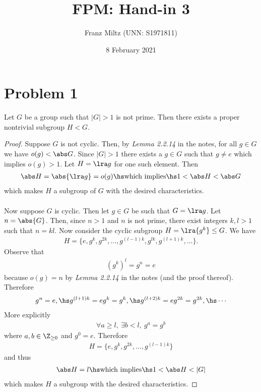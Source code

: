 \documentclass{article}
\begin{document}
\title{FPM: Hand-in 3}
\author{Franz Miltz (UNN: S1971811)}
\date{8 February 2021}
\maketitle

\section*{Problem 1}

\begin{claim*}
    Let $G$ be a group such that $|G|>1$ is not prime. Then
    there exists a proper nontrivial subgroup $H<G$.
\end{claim*}

\begin{proof}
    Suppose $G$ is not cyclic. Then, by \emph{Lemma 2.2.14} in the notes,
    for all $g\in G$ we have $o(g)<\abs G$. Since $|G|>1$ there exists
    a $g\in G$ such that $g\not=e$ which implies $o(g)>1$.
    Let $H=\lra g$ for one such element. Then
    \begin{align*}
        \abs H = \abs{\lra g} = o(g) \hs\text{which implies}\hs 1 < \abs H < \abs G
    \end{align*}
    which makes $H$ a subgroup of $G$ with
    the desired characteristics.\\\\
    Now suppose $G$ is cyclic. Then let $g\in G$ be such that
    $G=\lra g$. Let $n=\abs{G}$. Then, since $n>1$ and $n$ is not prime,
    there exist integers $k,l>1$ such that $n=kl$.
    Now consider the cyclic subgroup $H=\lra{g^k}\leq G$. We have
    \begin{align*}
        H =\{e, g^k, g^{2k}, ..., g^{(l-1)k}, g^{lk}, g^{(l+1)k}, ...\}.
    \end{align*}
    Observe that
    \begin{align*}
        \left(g^k\right)^l = g^n = e
    \end{align*}
    because $o(g)=n$ by \emph{Lemma 2.2.14} in the notes (and the proof
    thereof). Therefore
    \begin{align*}
        g^n = e,\hs g^{(l+1)k} = eg^k = g^k, \hs g^{(l+2)k}=eg^{2k}=g^{2k},\hs \cdots
    \end{align*}
    More explicitly
    \begin{align*}
        \forall a \geq l,\: \exists b<l,\: g^a = g^b
    \end{align*}
    where $a,b\in\Z_{\geq 0}$ and $g^0 = e$. Therefore
    \begin{align*}
        H = \{e, g^k, g^{2k}, ..., g^{(l-1)k}\}
    \end{align*}
    and thus
    \begin{align*}
        \abs H = l \hs\text{which implies}\hs 1 < \abs H < |G|
    \end{align*}
    which makes $H$ a subgroup with the desired characteristics.
\end{proof}
\end{document}

